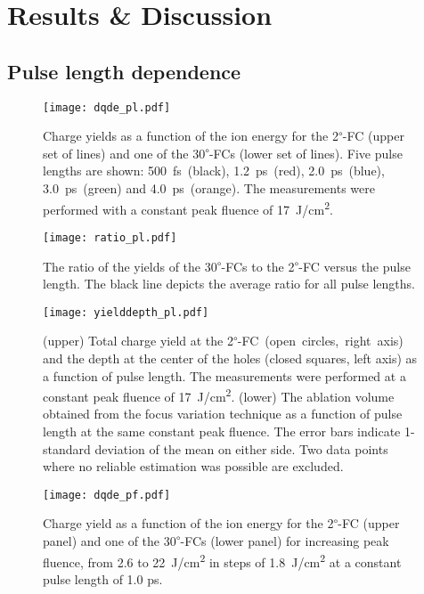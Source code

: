 \documentclass[aip, jap, reprint, amsmath, amssymb]{revtex4-1}
\begin{document}
\section{\label{sec:RandD}Results \& Discussion}
\subsection*{Pulse length dependence}

\begin{figure}[b!]
\texttt{[image: dqde\_pl.pdf]}
\caption{Charge yields as a function of the ion energy for the 2\textsuperscript{$\circ$}-FC (upper set of lines) and one of the 30\textsuperscript{$\circ$}-FCs (lower set of lines). Five pulse lengths are shown: \mbox{500 fs (black)}, \mbox{1.2 ps (red)}, \mbox{2.0 ps (blue)}, \mbox{3.0 ps (green)} and \mbox{4.0 ps (orange)}. The measurements were performed with a constant peak fluence of \mbox{17 J/cm\textsuperscript{2}}.}
\label{fig:dqde_pl}
\end{figure}

\begin{figure}[]
\texttt{[image: ratio\_pl.pdf]}
\caption{The ratio of the yields of the \mbox{30\textsuperscript{$\circ$}-FCs} to the \mbox{2\textsuperscript{$\circ$}-FC} versus the pulse length. The black line depicts the average ratio for all pulse lengths.}
\label{fig:ratio_pl}
\end{figure}

\begin{figure}[]
\texttt{[image: yielddepth\_pl.pdf]}
\caption{(upper) Total charge yield at the \mbox{2\textsuperscript{$\circ$}-FC (open circles, right axis)} and the depth at the center of the holes (closed squares, left axis) as a function of pulse length. The measurements were performed at a constant peak fluence of \mbox{17 J/cm\textsuperscript{2}}. (lower) The ablation volume obtained from the focus variation technique\cite{danzl2011} as a function of pulse length at the same constant peak fluence. The error bars indicate 1-standard deviation of the mean on either side. Two data points where no reliable estimation was possible are excluded.}
\label{fig:yielddepth_pl}
\end{figure}

\begin{figure}[b]
\texttt{[image: dqde\_pf.pdf]}
\caption{Charge yield as a function of the ion energy for the 2\textsuperscript{$\circ$}-FC (upper panel) and one of the 30\textsuperscript{$\circ$}-FCs (lower panel) for increasing peak fluence, from 2.6 to \mbox{22 J/cm\textsuperscript{2}} in steps of \mbox{1.8 J/cm\textsuperscript{2}} at a constant pulse length of 1.0 ps.}
\label{fig:dqde_pf}
\end{figure}
\end{document}
